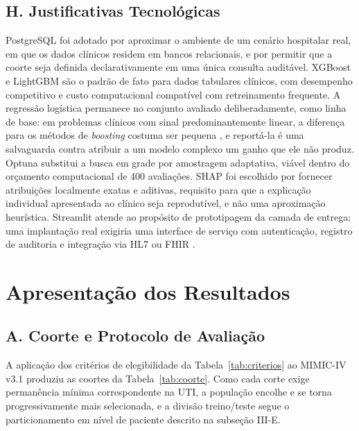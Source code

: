 \documentclass{ieeeaccess}
\begin{document}
\subsection*{H. Justificativas Tecnológicas}
PostgreSQL foi adotado por aproximar o ambiente de um cenário hospitalar real, em que os dados clínicos residem em bancos relacionais, e por permitir que a coorte seja definida declarativamente em uma única consulta auditável. XGBoost \cite{Chen2016} e LightGBM \cite{Ke2017} são o padrão de fato para dados tabulares clínicos, com desempenho competitivo e custo computacional compatível com retreinamento frequente. A regressão logística permanece no conjunto avaliado deliberadamente, como linha de base: em problemas clínicos com sinal predominantemente linear, a diferença para os métodos de \textit{boosting} costuma ser pequena \cite{Patton2023}, e reportá-la é uma salvaguarda contra atribuir a um modelo complexo um ganho que ele não produz. Optuna substitui a busca em grade por amostragem adaptativa, viável dentro do orçamento computacional de 400 avaliações. SHAP foi escolhido por fornecer atribuições localmente exatas e aditivas, requisito para que a explicação individual apresentada ao clínico seja reprodutível, e não uma aproximação heurística. Streamlit atende ao propósito de prototipagem da camada de entrega; uma implantação real exigiria uma interface de serviço com autenticação, registro de auditoria e integração via HL7 ou FHIR \cite{Bender2013}.


\section{Apresentação dos Resultados}

\subsection*{A. Coorte e Protocolo de Avaliação}
A aplicação dos critérios de elegibilidade da Tabela~\ref{tab:criterios} ao MIMIC-IV v3.1 \cite{Johnson2023} produziu as coortes da Tabela~\ref{tab:coorte}. Como cada corte exige permanência mínima correspondente na UTI, a população encolhe e se torna progressivamente mais selecionada, e a divisão treino/teste segue o particionamento em nível de paciente descrito na subseção III-E.
\end{document}

